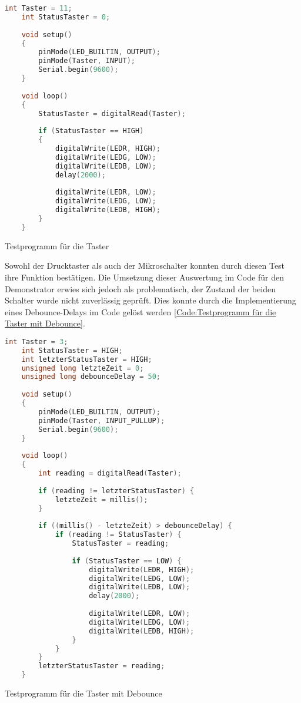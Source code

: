 \begin{code}
	\begin{lstlisting}[language=c++]
	int Taster = 11;
	int StatusTaster = 0;
	
	void setup()
	{
		pinMode(LED_BUILTIN, OUTPUT);
		pinMode(Taster, INPUT);
		Serial.begin(9600);
	}
	
	void loop()
	{
		StatusTaster = digitalRead(Taster);
		
		if (StatusTaster == HIGH)
		{
			digitalWrite(LEDR, HIGH);
			digitalWrite(LEDG, LOW);
			digitalWrite(LEDB, LOW);
			delay(2000);
			
			digitalWrite(LEDR, LOW);
			digitalWrite(LEDG, LOW);
			digitalWrite(LEDB, HIGH);
		}
	}
\end{lstlisting}      

\caption[Testprogramm für die Taster]{Testprogramm für die Taster}\label{Code:Testprogramm für die Taster}    
\end{code} 

Sowohl der Drucktaster als auch der Mikroschalter konnten durch diesen Test ihre Funktion bestätigen. Die Umsetzung dieser Auswertung im Code für den Demonstrator erwies sich jedoch als problematisch, der Zustand der beiden Schalter wurde nicht zuverlässig geprüft. Dies konnte durch die Implementierung eines Debounce-Delays \cite{SM.2022} im Code gelöst werden \ref{Code:Testprogramm für die Taster mit Debounce}.

\begin{code}
	\begin{lstlisting}[language=c++]
	int Taster = 3;
	int StatusTaster = HIGH;
	int letzterStatusTaster = HIGH;
	unsigned long letzteZeit = 0;
	unsigned long debounceDelay = 50;
	
	void setup()
	{
		pinMode(LED_BUILTIN, OUTPUT);
		pinMode(Taster, INPUT_PULLUP);
		Serial.begin(9600);
	}
	
	void loop()
	{
		int reading = digitalRead(Taster);
		
		if (reading != letzterStatusTaster) {
			letzteZeit = millis();
		}
		
		if ((millis() - letzteZeit) > debounceDelay) {
			if (reading != StatusTaster) {
				StatusTaster = reading;
				
				if (StatusTaster == LOW) {
					digitalWrite(LEDR, HIGH);
					digitalWrite(LEDG, LOW);
					digitalWrite(LEDB, LOW);
					delay(2000);
					
					digitalWrite(LEDR, LOW);
					digitalWrite(LEDG, LOW);
					digitalWrite(LEDB, HIGH);
				}
			}
		}
		letzterStatusTaster = reading;
	}
\end{lstlisting}      

\caption[Testprogramm für die Taster mit Debounce]{Testprogramm für die Taster mit Debounce}\label{Code:Testprogramm für die Taster mit Debounce}    
\end{code}


